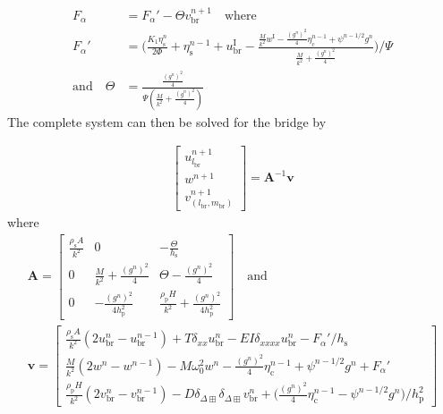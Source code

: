 \documentclass{article}
\begin{document}
\begin{equation}
\begin{aligned}
    F_\alpha &= F_\alpha'- \Theta v_{\text{br}}^{n+1} \quad \text{where}\\
    F_\alpha' &= \Bigg(\frac{K_1\eta_\text{s}^n}{2\Phi}+\eta_\text{s}^{n-1}+ u^\text{I}_\text{br}
    -\frac{\frac{M}{k^2}w^\text{I}-\frac{(g^n)^2}{4}\eta_\text{c}^{n-1} + \psi^{n-1/2}g^n}{\frac{M}{k^2}+\frac{(g^n)^2}{4}}\Bigg) / \Psi \nonumber \\
    \text{and} \quad \Theta &= \frac{\frac{(g^n)^2}{4}}{\Psi(\frac{M}{k^2}+\frac{(g^n)^2}{4})}
    \end{aligned}
\end{equation}
The complete system can then be solved for the bridge by

\begin{align}
\begin{bmatrix}
        u^{n+1}_{l_\text{br}}\\
        w^{n+1}\\
        v^{n+1}_{(l_\text{br}, m_\text{br})}
    \end{bmatrix}
    = 
    \mathbf{A}^{-1}\mathbf{v}
\end{align}
where
\begin{equation}
\begin{gathered}
\mathbf{A} = 
    \begin{bmatrix}
        \frac{\rho_\text{s} A}{k^2} & 0 & - \frac{\Theta}{h_\text{s}}\\
        0 & \frac{M}{k^2}+\frac{(g^n)^2}{4} &\Theta-\frac{(g^n)^2}{4}\\
        0 & -\frac{(g^n)^2}{4h_\text{p}^2} & \frac{\rho_\text{p}H}{k^2} + \frac{(g^n)^2}{4h_\text{p}^2}
    \end{bmatrix}
    \quad \text{and}\\
    \mathbf{v} = 
    \begin{bmatrix}
        \frac{\rho_\text{s} A}{k^2}(2u^n_\text{br}-u_\text{br}^{n-1})+T\delta_{xx}u_\text{br}^n-EI\delta_{xxxx}u_\text{br}^n - F_\alpha'/h_\text{s}\\
        \frac{M}{k^2}(2w^n-w^{n-1})-M\omega_0^2w^n-\frac{(g^n)^2}{4}\eta_\text{c}^{n-1}+\psi^{n-1/2}g^n + F_\alpha'\\
        \frac{\rho_\text{p}H}{k^2}(2v_\text{br}^n-v_\text{br}^{n-1})-D\delta_{\Delta\boxplus}\delta_{\Delta\boxplus}v_\text{br}^n+\Big(\frac{(g^n)^2}{4}\eta_\text{c}^{n-1}-\psi^{n-1/2}g^n\Big)/h_\text{p}^2
    \end{bmatrix}
    \nonumber
\end{gathered}
\end{equation}
\end{document}
